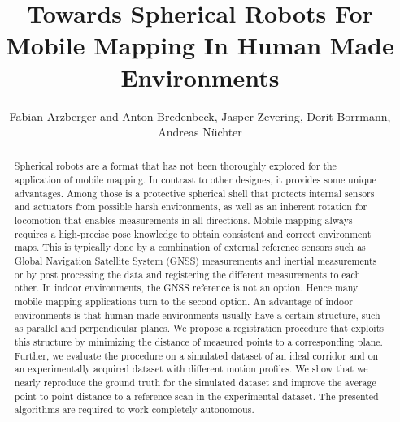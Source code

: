 \documentclass[5p]{elsarticle}
\begin{document}
\begin{frontmatter}

\title{Towards Spherical Robots For Mobile Mapping In Human Made Environments}

\author{Fabian Arzberger and Anton Bredenbeck, Jasper Zevering, Dorit Borrmann, Andreas Nüchter}
\address{Informatics VII: Robotics and Telematics,
Julius-Maximilians-University Würzburg, Germany\\
e-mail: dorit.borrmann@uni-wuerzburg.de}




\begin{abstract}
Spherical robots are a format that has not been thoroughly explored for the application of mobile mapping. 
In contrast to other designes, it provides some unique advantages. 
Among those is a protective spherical shell that protects internal sensors and actuators from possible harsh environments, as well as an inherent rotation for locomotion that enables measurements in all directions.
Mobile mapping always requires a high-precise pose knowledge to obtain consistent and correct environment maps. 
This is typically done by a combination of external reference sensors such as Global Navigation Satellite System (GNSS) measurements and inertial measurements or by post processing the data and registering the different measurements to each other. 
In indoor environments, the GNSS reference is not an option.
Hence many mobile mapping applications turn to the second option.
An advantage of indoor environments is that human-made environments usually have a certain structure, such as parallel and perpendicular planes.
We propose a registration procedure that exploits this structure by minimizing the distance of measured points to a corresponding plane. 
Further, we evaluate the procedure on a simulated dataset of an ideal corridor and on an experimentally acquired dataset with different motion profiles. 
We show that we nearly reproduce the ground truth for the simulated dataset and improve the average point-to-point distance to a reference scan in the experimental dataset.
The presented algorithms are required to work completely autonomous.
\end{abstract}


\end{frontmatter}
\end{document}
